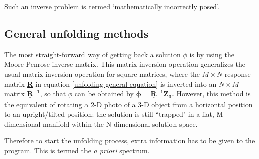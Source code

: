 \documentclass[a4paper, 12pt]{article}
\newcommand{\matr}[1]{\underline{\underline{\textbf{#1}}}}
\newcommand{\ve}[1]{\boldsymbol{#1}}
\begin{document}



Such an inverse problem is termed `mathematically incorrectly posed'. \cite{BirminghamUnfolding}


\subsection{General unfolding methods} \label{general methods}
The most straight-forward way of getting back a solution $\phi$ is by using the Moore-Penrose inverse matrix. This matrix inversion operation generalizes the usual matrix inversion operation for square matrices, where the $M\times N$ response matrix \matr{R} in equation \ref{unfolding general equation} is inverted into an $N \times M$ matrix $\mathbf{\underline{\underline{R}}^{-1}}$, so that $\phi$ can be obtained by $\ve{\phi} = \mathbf{\underline{\underline{R}}^{-1}} \ve{Z_0}$. However, this method is the equivalent of rotating a 2-D photo of a 3-D object from a horizontal position to an upright/tilted position: the solution is still ``trapped" in a flat, M-dimensional manifold within the N-dimensional solution space.

Therefore to start the unfolding process, extra information has to be given to the program. This is termed the \emph{a priori} spectrum.
\end{document}
